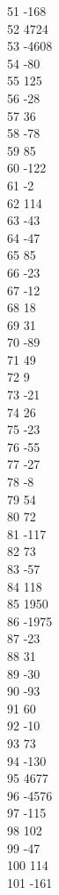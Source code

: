 { 51	-168 \\
 52	4724 \\
 53	-4608 \\
 54	-80 \\
 55	125 \\
 56	-28 \\
 57	36 \\
 58	-78 \\
 59	85 \\
 60	-122 \\
 61	-2 \\
 62	114 \\
 63	-43 \\
 64	-47 \\
 65	85 \\
 66	-23 \\
 67	-12 \\
 68	18 \\
 69	31 \\
 70	-89 \\
 71	49 \\
 72	9 \\
 73	-21 \\
 74	26 \\
 75	-23 \\
 76	-55 \\
 77	-27 \\
 78	-8 \\
 79	54 \\
 80	72 \\
 81	-117 \\
 82	73 \\
 83	-57 \\
 84	118 \\
 85	1950 \\
 86	-1975 \\
 87	-23 \\
 88	31 \\
 89	-30 \\
 90	-93 \\
 91	60 \\
 92	-10 \\
 93	73 \\
 94	-130 \\
 95	4677 \\
 96	-4576 \\
 97	-115 \\
 98	102 \\
 99	-47 \\
 100	114 \\
 101	-161 \\
}
